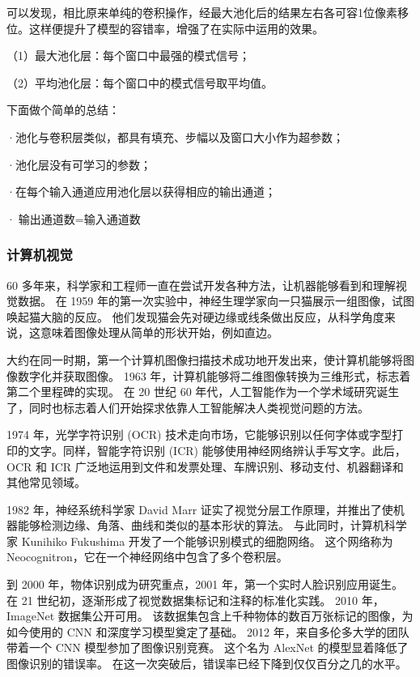 可以发现，相比原来单纯的卷积操作，经最大池化后的结果左右各可容1位像素移位。这样便提升了模型的容错率，增强了在实际中运用的效果。

（1）最大池化层：每个窗口中最强的模式信号；

（2）平均池化层：每个窗口中的模式信号取平均值。

下面做个简单的总结：

·池化与卷积层类似，都具有填充、步幅以及窗口大小作为超参数；

·池化层没有可学习的参数；

·在每个输入通道应用池化层以获得相应的输出通道；

·$\text{输出通道数}=\text{输入通道数}$

\subsubsection{计算机视觉}

60 多年来，科学家和工程师一直在尝试开发各种方法，让机器能够看到和理解视觉数据。 在 1959 年的第一次实验中，神经生理学家向一只猫展示一组图像，试图唤起猫大脑的反应。 他们发现猫会先对硬边缘或线条做出反应，从科学角度来说，这意味着图像处理从简单的形状开始，例如直边。

大约在同一时期，第一个计算机图像扫描技术成功地开发出来，使计算机能够将图像数字化并获取图像。 1963 年，计算机能够将二维图像转换为三维形式，标志着第二个里程碑的实现。 在 20 世纪 60 年代，人工智能作为一个学术域研究诞生了，同时也标志着人们开始探求依靠人工智能解决人类视觉问题的方法。

1974 年，光学字符识别 (OCR) 技术走向市场，它能够识别以任何字体或字型打印的文字。同样，智能字符识别 (ICR) 能够使用神经网络辨认手写文字。此后，OCR 和 ICR 广泛地运用到文件和发票处理、车牌识别、移动支付、机器翻译和其他常见领域。

1982 年，神经系统科学家 David Marr 证实了视觉分层工作原理，并推出了使机器能够检测边缘、角落、曲线和类似的基本形状的算法。 与此同时，计算机科学家 Kunihiko Fukushima 开发了一个能够识别模式的细胞网络。 这个网络称为 Neocognitron，它在一个神经网络中包含了多个卷积层。

到 2000 年，物体识别成为研究重点，2001 年，第一个实时人脸识别应用诞生。 在 21 世纪初，逐渐形成了视觉数据集标记和注释的标准化实践。 2010 年，ImageNet 数据集公开可用。 该数据集包含上千种物体的数百万张标记的图像，为如今使用的 CNN 和深度学习模型奠定了基础。 2012 年，来自多伦多大学的团队带着一个 CNN 模型参加了图像识别竞赛。 这个名为 AlexNet 的模型显着降低了图像识别的错误率。 在这一次突破后，错误率已经下降到仅仅百分之几的水平。

